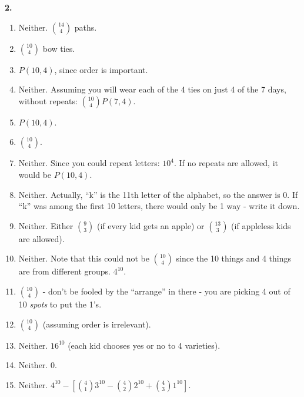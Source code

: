 \documentclass[10pt,]{book}
\theoremstyle{plain}
\theoremstyle{definition}
\theoremstyle{definition}
\theoremstyle{definition}
\numberwithin{equation}{chapter}
\begin{document}
\par\smallskip
\noindent\textbf{2.}\quad{}
            \leavevmode%
\begin{enumerate}[label=(\alph*)]
\item\hypertarget{li-693}{}
                  Neither. \({14 \choose 4}\) paths.
\item\hypertarget{li-694}{}\({10\choose 4}\) bow ties.%
\item\hypertarget{li-695}{}\(P(10,4)\), since order is important.%
\item\hypertarget{li-696}{}
                  Neither. Assuming you will wear each of the 4 ties on just 4 of the 7 days, without repeats: \({10\choose 4}P(7,4)\).
\item\hypertarget{li-697}{}\(P(10,4)\).%
\item\hypertarget{li-698}{}\({10\choose 4}\).%
\item\hypertarget{li-699}{}
                  Neither. Since you could repeat letters: \(10^4\). If no repeats are allowed, it would be \(P(10,4)\).
\item\hypertarget{li-700}{}
                  Neither. Actually, ``k'' is the 11th letter of the alphabet, so the answer is 0. If ``k'' was among the first 10 letters, there would only be 1 way - write it down.
\item\hypertarget{li-701}{}
                  Neither. Either \({9\choose 3}\) (if every kid gets an apple) or \({13 \choose 3}\) (if appleless kids are allowed).
\item\hypertarget{li-702}{}
                  Neither. Note that this could not be \({10 \choose 4}\) since the 10 things and 4 things are from different groups. \(4^{10}\).
\item\hypertarget{li-703}{}\({10 \choose 4}\) - don't be fooled by the ``arrange'' in there - you are picking 4 out of 10 \emph{spots} to put the 1's.%
\item\hypertarget{li-704}{}\({10 \choose 4}\) (assuming order is irrelevant).%
\item\hypertarget{li-705}{}
                  Neither. \(16^{10}\) (each kid chooses yes or no to 4 varieties).
\item\hypertarget{li-706}{}
                  Neither. 0.
\item\hypertarget{li-707}{}
                  Neither. \(4^{10} - [{4\choose 1}3^{10} - {4\choose 2}2^{10} + {4 \choose 3}1^{10}]\).

\end{enumerate}
\end{document}
